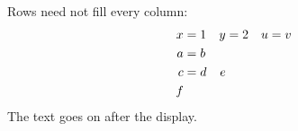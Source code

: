 \documentclass{article}
\begin{document}
Rows need not fill every column:
\begin{align}
x &= 1 & y &= 2 & u &= v \\
a &= b \\
c &= d & e \notag \\
f
\end{align}
The text goes on after the display.
\end{document}
